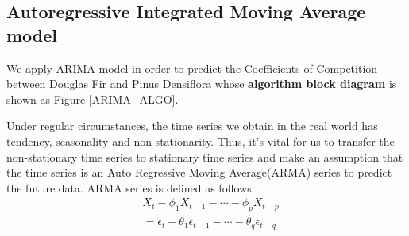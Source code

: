 \documentclass{mcmthesis}
\numberwithin{figure}{section}
\numberwithin{table}{section}
\numberwithin{equation}{section}
\begin{document}
\subsection{Autoregressive Integrated Moving Average model}

We apply ARIMA model in order to predict the Coefficients of Competition between 
Douglas Fir and Pinus Densiflora whose \textbf{algorithm block diagram} 
is shown as Figure \ref{ARIMA_ALGO}.
\par
Under regular circumstances, the time series we obtain in the real world
  has tendency, seasonality and non-stationarity. Thus, it's vital for 
  us to transfer the non-stationary time series to stationary time series
  and make an assumption that the time series is an Auto 
  Regressive Moving Average(ARMA) series to predict the 
  future data. ARMA series is defined as follows.
  \begin{align*}
    &X_t-\phi_1X_{t-1}-\cdots -\phi_pX_{t-p} \\
    &= \epsilon_t - \theta_1\epsilon_{t-1}-\cdots-\theta_q\epsilon_{t-q}
  \end{align*}
 
\end{document}
